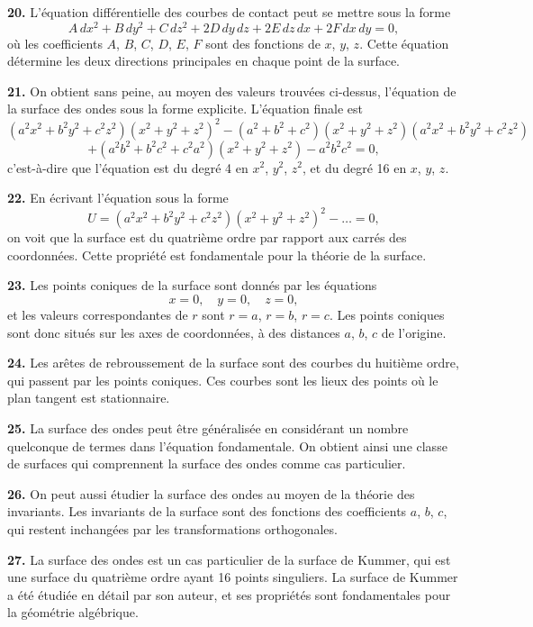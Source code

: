 \documentclass[11pt,a4paper]{book}
\begin{document}
\textbf{20.} L'\'equation diff\'erentielle des courbes de contact peut se mettre sous
la forme
\[
A\,dx^2 + B\,dy^2 + C\,dz^2 + 2D\,dy\,dz + 2E\,dz\,dx + 2F\,dx\,dy = 0,
\]
o\`u les coefficients $A$, $B$, $C$, $D$, $E$, $F$ sont des fonctions de $x$, $y$, $z$. Cette \'equation
d\'etermine les deux directions principales en chaque point de la surface.

\newpage
\textbf{21.} On obtient sans peine, au moyen des valeurs trouv\'ees ci-dessus,
l'\'equation de la surface des ondes sous la forme explicite. L'\'equation finale est
\[
(a^2x^2 + b^2y^2 + c^2z^2)(x^2 + y^2 + z^2)^2 - (a^2 + b^2 + c^2)(x^2 + y^2 + z^2)(a^2x^2 + b^2y^2 + c^2z^2)
\]
\[
+ (a^2b^2 + b^2c^2 + c^2a^2)(x^2 + y^2 + z^2) - a^2b^2c^2 = 0,
\]
c'est-\`a-dire que l'\'equation est du degr\'e 4 en $x^2$, $y^2$, $z^2$, et du degr\'e 16 en $x$, $y$, $z$.

\textbf{22.} En \'ecrivant l'\'equation sous la forme
\[
U = (a^2x^2 + b^2y^2 + c^2z^2)(x^2 + y^2 + z^2)^2 - \ldots = 0,
\]
on voit que la surface est du quatri\`eme ordre par rapport aux carr\'es des
coordonn\'ees. Cette propri\'et\'e est fondamentale pour la th\'eorie de la surface.

\textbf{23.} Les points coniques de la surface sont donn\'es par les \'equations
\[
x = 0, \quad y = 0, \quad z = 0,
\]
et les valeurs correspondantes de $r$ sont $r = a$, $r = b$, $r = c$. Les points coniques
sont donc situ\'es sur les axes de coordonn\'ees, \`a des distances $a$, $b$, $c$ de l'origine.

\textbf{24.} Les ar\^etes de rebroussement de la surface sont des courbes du huiti\`eme
ordre, qui passent par les points coniques. Ces courbes sont les lieux des points
o\`u le plan tangent est stationnaire.

\textbf{25.} La surface des ondes peut \^etre g\'en\'eralis\'ee en consid\'erant un nombre
quelconque de termes dans l'\'equation fondamentale. On obtient ainsi une classe
de surfaces qui comprennent la surface des ondes comme cas particulier.

\textbf{26.} On peut aussi \'etudier la surface des ondes au moyen de la th\'eorie
des invariants. Les invariants de la surface sont des fonctions des coefficients
$a$, $b$, $c$, qui restent inchang\'ees par les transformations orthogonales.

\textbf{27.} La surface des ondes est un cas particulier de la surface de Kummer,
qui est une surface du quatri\`eme ordre ayant 16 points singuliers. La surface de
Kummer a \'et\'e \'etudi\'ee en d\'etail par son auteur, et ses propri\'et\'es sont fondamentales
pour la g\'eom\'etrie alg\'ebrique.
\end{document}
